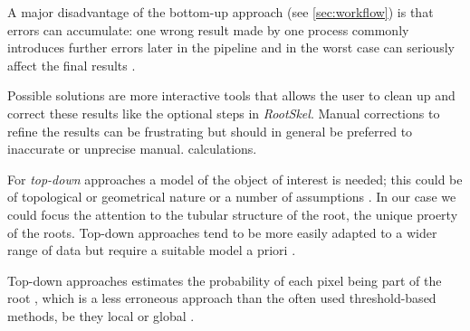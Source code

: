 A major disadvantage of the bottom-up approach (see \ref{sec:workflow}) is that errors can accumulate: one wrong result made by one process commonly introduces further errors later in the pipeline and in the worst case can seriously affect the final results \cite{pound2013rootnav}.

Possible solutions are more interactive tools that allows the user to clean up and correct these results \cite{armengaud2009ez,clark20113} like the optional steps in \textit{RootSkel}. Manual corrections to refine the results can be frustrating but should in general be preferred to inaccurate or unprecise manual. calculations.

For \textit{top-down} approaches a model of the object of interest is needed; this could be of topological or geometrical nature \cite{pound2012cellset,taub1996root} or a number of assumptions \cite{mooney2012developing}. In our case we could focus the attention to the tubular structure of the root, the unique proerty of the roots. Top-down approaches tend to be more easily adapted to a wider range of data but require a suitable model a priori  \cite{pound2013rootnav}.

Top-down approaches estimates the probability of each pixel being part of the root \cite{pound2013rootnav}, which is a less erroneous approach than the often used threshold-based methods, be they local or global \cite{pound2013rootnav}. 


